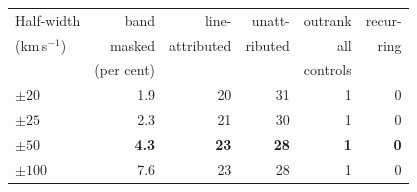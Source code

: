 \begin{tabular}{@{}lrrrrr@{}}
\hline
Half-width & band & line- & unatt- & outrank & recur- \\
(km\,s$^{-1}$) & masked & attributed & ributed & all & ring \\
 & (per cent) & & & controls & \\
\hline
$\pm20$ & 1.9 & 20 & 31 & 1 & 0 \\
$\pm25$ & 2.3 & 21 & 30 & 1 & 0 \\
\textbf{$\pm50$} & \textbf{4.3} & \textbf{23} & \textbf{28} & \textbf{1} & \textbf{0} \\
$\pm100$ & 7.6 & 23 & 28 & 1 & 0 \\
\hline
\end{tabular}
